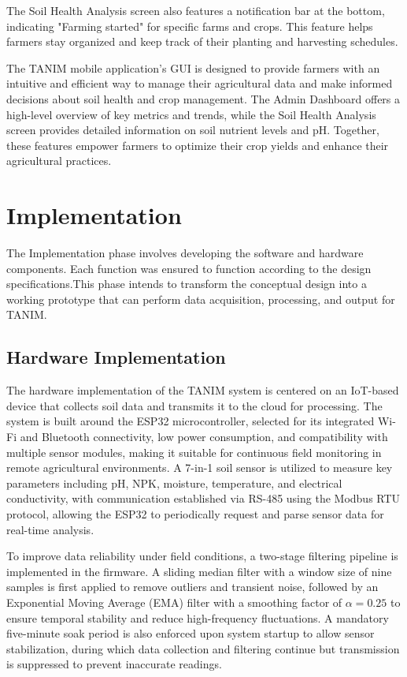 {	The Soil Health Analysis screen also features a notification bar at the bottom, indicating "Farming started" for specific farms and crops. This feature helps farmers stay organized and keep track of their planting and harvesting schedules.
	
	The TANIM mobile application's GUI is designed to provide farmers with an intuitive and efficient way to manage their agricultural data and make informed decisions about soil health and crop management. The Admin Dashboard offers a high-level overview of key metrics and trends, while the Soil Health Analysis screen provides detailed information on soil nutrient levels and pH. Together, these features empower farmers to optimize their crop yields and enhance their agricultural practices.
	
	\section{Implementation}
	The Implementation phase involves developing the software and hardware components. Each function was ensured to function according to the design specifications.This phase intends to transform the conceptual design into a working prototype that can perform data acquisition, processing, and output for TANIM.
	
	\subsection{Hardware Implementation}
	The hardware implementation of the TANIM system is centered on an IoT-based device that collects soil data and transmits it to the cloud for processing. The system is built around the ESP32 microcontroller, selected for its integrated Wi-Fi and Bluetooth connectivity, low power consumption, and compatibility with multiple sensor modules, making it suitable for continuous field monitoring in remote agricultural environments. A 7-in-1 soil sensor is utilized to measure key parameters including pH, NPK, moisture, temperature, and electrical conductivity, with communication established via RS-485 using the Modbus RTU protocol, allowing the ESP32 to periodically request and parse sensor data for real-time analysis.
	
	To improve data reliability under field conditions, a two-stage filtering pipeline is implemented in the firmware. A sliding median filter with a window size of nine samples is first applied to remove outliers and transient noise, followed by an Exponential Moving Average (EMA) filter with a smoothing factor of $\alpha = 0.25$ to ensure temporal stability and reduce high-frequency fluctuations. A mandatory five-minute soak period is also enforced upon system startup to allow sensor stabilization, during which data collection and filtering continue but transmission is suppressed to prevent inaccurate readings.
	
}
